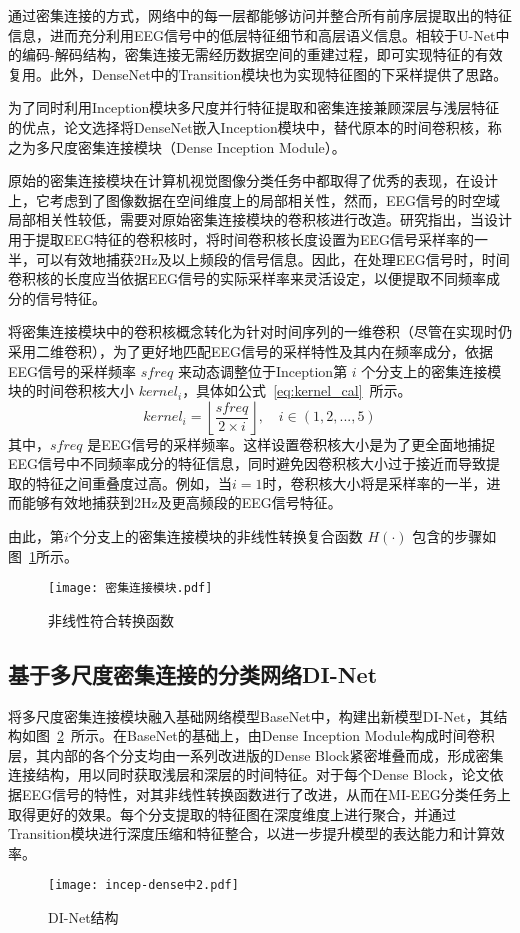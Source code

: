 通过密集连接的方式，网络中的每一层都能够访问并整合所有前序层提取出的特征信息，进而充分利用EEG信号中的低层特征细节和高层语义信息。相较于U-Net中的编码-解码结构，密集连接无需经历数据空间的重建过程，即可实现特征的有效复用。此外，DenseNet中的Transition模块也为实现特征图的下采样提供了思路。

为了同时利用Inception模块多尺度并行特征提取和密集连接兼顾深层与浅层特征的优点，论文选择将DenseNet嵌入Inception模块中，替代原本的时间卷积核，称之为多尺度密集连接模块（Dense Inception Module）。

原始的密集连接模块在计算机视觉图像分类任务中都取得了优秀的表现，在设计上，它考虑到了图像数据在空间维度上的局部相关性，然而，EEG信号的时空域局部相关性较低，需要对原始密集连接模块的卷积核进行改造。研究指出\cite{lawhern2018eegnet}，当设计用于提取EEG特征的卷积核时，将时间卷积核长度设置为EEG信号采样率的一半，可以有效地捕获2Hz及以上频段的信号信息。因此，在处理EEG信号时，时间卷积核的长度应当依据EEG信号的实际采样率来灵活设定，以便提取不同频率成分的信号特征。

将密集连接模块中的卷积核概念转化为针对时间序列的一维卷积（尽管在实现时仍采用二维卷积），为了更好地匹配EEG信号的采样特性及其内在频率成分，依据EEG信号的采样频率 \(sfreq\) 来动态调整位于Inception第 \(i\) 个分支上的密集连接模块的时间卷积核大小 \(kernel_i\)，具体如公式~\ref{eq:kernel_cal}~所示。
\begin{equation}
    kernel_i = \left \lfloor \frac{sfreq}{2 \times i} \right \rfloor , \quad i \in (1,2,...,5)
    \label{eq:kernel_cal}
\end{equation}
其中，\(sfreq\) 是EEG信号的采样频率。这样设置卷积核大小是为了更全面地捕捉EEG信号中不同频率成分的特征信息，同时避免因卷积核大小过于接近而导致提取的特征之间重叠度过高。例如，当\(i=1\)时，卷积核大小将是采样率的一半，进而能够有效地捕获到2Hz及更高频段的EEG信号特征。

由此，第\(i\)个分支上的密集连接模块的非线性转换复合函数 \(H(·)\) 包含的步骤如图~\ref{fig:dense-kernel}所示。
\begin{figure}[ht]
    \centering
    \texttt{[image: 密集连接模块.pdf]}
    \caption{非线性符合转换函数}
    \label{fig:dense-kernel}
\end{figure}

\subsection{基于多尺度密集连接的分类网络DI-Net}

将多尺度密集连接模块融入基础网络模型BaseNet中，构建出新模型DI-Net，其结构如图~\ref{fig:incep-dense}~所示。在BaseNet的基础上，由Dense Inception Module构成时间卷积层，其内部的各个分支均由一系列改进版的Dense Block紧密堆叠而成，形成密集连接结构，用以同时获取浅层和深层的时间特征。对于每个Dense Block，论文依据EEG信号的特性，对其非线性转换函数进行了改进，从而在MI-EEG分类任务上取得更好的效果。每个分支提取的特征图在深度维度上进行聚合，并通过Transition模块进行深度压缩和特征整合，以进一步提升模型的表达能力和计算效率。
\begin{figure}[ht]
  \centering
  \texttt{[image: incep-dense中2.pdf]}
  \caption{DI-Net结构}
  \label{fig:incep-dense}
\end{figure}

